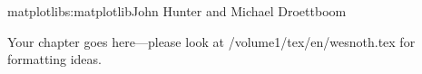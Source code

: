 \begin{aosachapter}{matplotlib}{s:matplotlib}{John Hunter and Michael Droettboom}

Your chapter goes here---please look at /volume1/tex/en/wesnoth.tex for 
formatting ideas.

\end{aosachapter}
